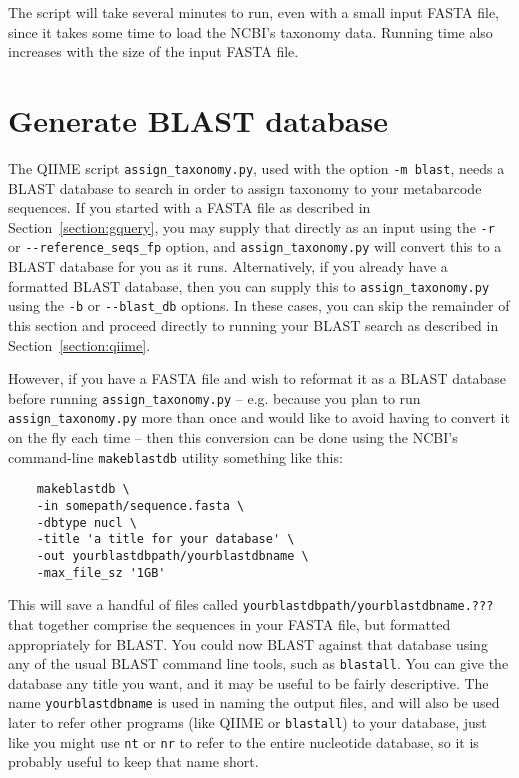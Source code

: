 \documentclass[11pt]{amsart}
\begin{document}
The script will take several minutes to run, even with a small input FASTA file, since it takes some time to load the NCBI's taxonomy data. Running time also increases with the size of the input FASTA file.

\section{Generate BLAST database}
\label{section:blast}

The QIIME script \verb|assign_taxonomy.py|, used with the option \verb|-m blast|, needs a BLAST database to search in order to assign taxonomy to your metabarcode sequences. If you started with a FASTA file as described in Section~\ref{section:gquery}, you may supply that directly as an input using the \verb|-r| or \verb|--reference_seqs_fp| option, and \verb|assign_taxonomy.py| will convert this to a BLAST database for you as it runs. Alternatively, if you already have a formatted BLAST database, then you can supply this to \verb|assign_taxonomy.py| using the \verb|-b| or \verb|--blast_db| options. In these cases, you can skip the remainder of this section and proceed directly to running your BLAST search as described in Section~\ref{section:qiime}.

However, if you have a FASTA file and wish to reformat it as a BLAST database before running \verb|assign_taxonomy.py| -- e.g. because you plan to run \verb|assign_taxonomy.py| more than once and would like to avoid having to convert it on the fly each time -- then this conversion can be done using the NCBI's command-line \verb|makeblastdb| utility something like this:

\begin{verbatim}
    makeblastdb \
    -in somepath/sequence.fasta \
    -dbtype nucl \
    -title 'a title for your database' \
    -out yourblastdbpath/yourblastdbname \
    -max_file_sz '1GB'
\end{verbatim}

This will save a handful of files called \verb|yourblastdbpath/yourblastdbname.???| that together comprise the sequences in your FASTA file, but formatted appropriately for BLAST. You could now BLAST against that database using any of the usual BLAST command line tools, such as \verb|blastall|. You can give the database any title you want, and it may be useful to be fairly descriptive. The name \verb|yourblastdbname| is used in naming the output files, and will also be used later to refer other programs (like QIIME or \verb|blastall|) to your database, just like you might use \verb|nt| or \verb|nr| to refer to the entire nucleotide database, so it is probably useful to keep that name short.
\end{document}
